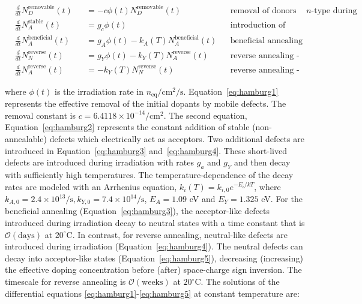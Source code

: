 \begin{align}
\label{eq:hamburg1}
&\frac{d }{d t}N_{D}^\text{removable}(t) &&=-c\phi(t) N_{D}^\text{removable}(t)&&\text{removal of donors for $n$-type during irradiation}\\\label{eq:hamburg2}
&\frac{d }{d t}N_{A}^\text{stable}(t) &&= g_c\phi(t)&&\text{introduction of stable defects during irradiation}\\\label{eq:hamburg3}
&\frac{d }{d t}N_{A}^\text{beneficial}(t)  &&=g_A\phi(t)-k_A(T)N_{A}^\text{beneficial}(t) &&\text{beneficial annealing}\\\label{eq:hamburg4}
&\frac{d }{d t}N_{N}^\text{reverse}(t)  &&= g_Y\phi(t)-k_Y(T)N_{A}^\text{reverse}(t) &&\text{reverse annealing - neutrals}\\\label{eq:hamburg5}
&\frac{d }{d t}N_{A}^\text{reverse}(t)  &&= - k_Y(T)N_{N}^\text{reverse}(t) &&\text{reverse annealing - acceptors} 
\end{align}

\noindent where $\phi(t)$ is the irradiation rate in  $n_\text{eq}/\text{cm}^2/\text{s}$.  Equation~\ref{eq:hamburg1} represents the effective removal of the initial dopants by mobile defects.  The removal constant is $c=6.4118\times 10^{-14}/\text{cm}^2$.  The second equation, Equation~\ref{eq:hamburg2} represents the constant addition of stable (non-annealable) defects which electrically act as acceptors.  Two additional defects are introduced in Equation~\ref{eq:hamburg3} and~\ref{eq:hamburg4}.  These short-lived defects are introduced during irradiation with rates $g_a$ and $g_Y$ and then decay with sufficiently high temperatures.  The temperature-dependence of the decay rates are modeled with an Arrhenius equation, $k_i(T)=k_{i,0}e^{-E_i/kT}$, where $k_{A,0}=2.4\times 10^{13}/\text{s}, k_{Y,0}=7.4\times 10^{14}/\text{s}$, $E_A=1.09$ eV and $E_Y=1.325$ eV.  For the beneficial annealing (Equation~\ref{eq:hamburg3}), the acceptor-like defects introduced during irradiation decay to neutral states with a time constant that is $\mathcal{O}(\text{days})$ at $20^{\circ}$C.  In contrast, for reverse annealing, neutral-like defects are introduced during irradiation (Equation~\ref{eq:hamburg4}). The neutral defects can decay into acceptor-like states (Equation~\ref{eq:hamburg5}), decreasing (increasing) the effective doping concentration before (after) space-charge sign inversion.  The timescale for reverse annealing is $\mathcal{O}(\text{weeks})$ at $20^{\circ}$C.  The solutions of the differential equations \ref{eq:hamburg1}-\ref{eq:hamburg5} at constant temperature are:

